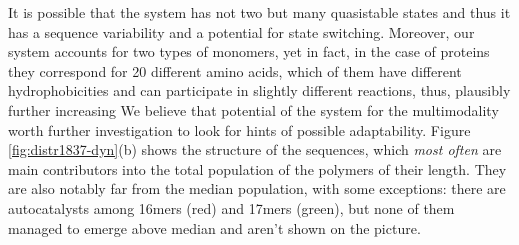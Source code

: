 \documentclass[journal=jacsat,manuscript=article,layout=twocolumn]{achemso}
\begin{document}
It is possible that the system has not two but many quasistable states and thus it has a sequence 
variability and a potential for state switching.
Moreover, our system accounts for two 
types of monomers, yet in fact, in the case of proteins they correspond for 20 different amino 
acids, which of them have different hydrophobicities and can participate in slightly different 
reactions, thus, plausibly further increasing  
We believe that potential of the system for the multimodality worth further investigation to look 
for hints of possible adaptability.
Figure \ref{fig:distr1837-dyn}(b) shows the structure of the sequences, which \textit{most often} 
are main contributors into the total population of the polymers of their length. They are also 
notably far from the median population, with some exceptions: there are autocatalysts 
among 16mers (red) and 17mers (green), but none of them managed to emerge above median and aren't 
shown on the picture.
\end{document}

